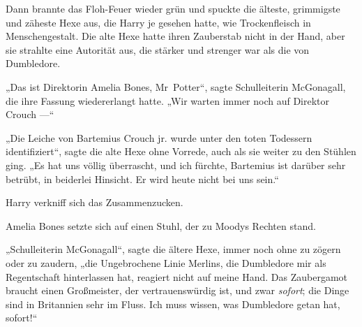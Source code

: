 Dann brannte das Floh-Feuer wieder grün und spuckte die älteste, grimmigste und zäheste Hexe aus, die Harry je gesehen hatte, wie Trockenfleisch in Menschengestalt. Die alte Hexe hatte ihren Zauberstab nicht in der Hand, aber sie strahlte eine Autorität aus, die stärker und strenger war als die von Dumbledore.

„Das ist Direktorin Amelia Bones, Mr~Potter“, sagte Schulleiterin McGonagall, die ihre Fassung wiedererlangt hatte.
„Wir warten immer noch auf Direktor Crouch —“

„Die Leiche von Bartemius Crouch jr. wurde unter den toten Todessern identifiziert“, sagte die alte Hexe ohne Vorrede, auch als sie weiter zu den Stühlen ging.
„Es hat uns völlig überrascht, und ich fürchte, Bartemius ist darüber sehr betrübt, in beiderlei Hinsicht. Er wird heute nicht bei uns sein.“

Harry verkniff sich das Zusammenzucken.

Amelia Bones setzte sich auf einen Stuhl, der zu Moodys Rechten stand.

„Schulleiterin McGonagall“, sagte die ältere Hexe, immer noch ohne zu zögern oder zu zaudern, „die Ungebrochene Linie Merlins, die Dumbledore mir als Regentschaft hinterlassen hat, reagiert nicht auf meine Hand. Das Zaubergamot braucht einen Großmeister, der vertrauenswürdig ist, und zwar \emph{sofort}; die Dinge sind in Britannien sehr im Fluss. Ich muss wissen, was Dumbledore getan hat, sofort!“

